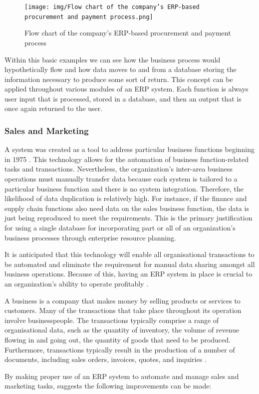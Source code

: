 \pagebreak
\begin{figure}[ht!]
    \centering
    \texttt{[image: img/Flow chart of the company’s ERP-based procurement and payment process.png]}
    \caption{Flow chart of the company’s ERP-based procurement and payment process}
    \label{fig:enter-label}
\end{figure}
\par{Within this basic examples we can see how the business process would hypothetically flow and how data moves to and from a database storing the information necessary to produce some sort of return. This concept can be applied throughout various modules of an ERP system. Each function is always user input that is processed, stored in a database, and then an output that is once again returned to the user.}
\subsubsection{Sales and Marketing}
\par{A system was created as a tool to address particular business functions beginning in 1975 \citep{monk2013concepts}. This technology allows for the automation of business function-related tasks and transactions. Nevertheless, the organization's inter-area business operations must manually transfer data because each system is tailored to a particular business function and there is no system integration. Therefore, the likelihood of data duplication is relatively high. For instance, if the finance and supply chain functions also need data on the sales business function, the data is just being reproduced to meet the requirements. This is the primary justification for using a single database for incorporating part or all of an organization's business processes through enterprise resource planning.

It is anticipated that this technology will enable all organisational transactions to be automated and eliminate the requirement for manual data sharing amongst all business operations. Because of this, having an ERP system in place is crucial to an organization's ability to operate profitably \citep{tsai2008impact}.
    
A business is a company that makes money by selling products or services to customers. Many of the transactions that take place throughout its operation involve businesspeople. The transactions typically comprise a range of organisational data, such as the quantity of inventory, the volume of revenue flowing in and going out, the quantity of goods that need to be produced. Furthermore, transactions typically result in the production of a number of documents, including sales orders, invoices, quotes, and inquiries \citep{xu2008review}.

By making proper use of an ERP system to automate and manage sales and marketing tasks, \cite{terminanto2017implementation} suggests the following improvements can be made:}

